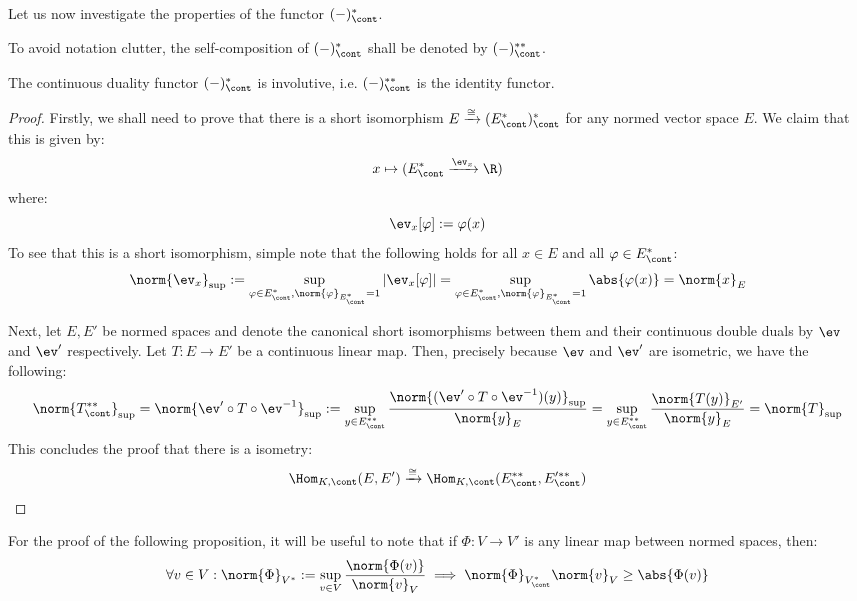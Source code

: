         Let us now investigate the properties of the functor $(-)^*_{\cont}$.
        \begin{convention}
            To avoid notation clutter, the self-composition of $(-)^*_{\cont}$ shall be denoted by $(-)^{**}_{\cont}$.
        \end{convention}
        \begin{lemma} \label{lemma: continuous_duality_involutive}
            The continuous duality functor $(-)^*_{\cont}$ is involutive, i.e. $(-)^{**}_{\cont}$ is the identity functor. 
        \end{lemma}
            \begin{proof}
                Firstly, we shall need to prove that there is a short isomorphism $E \xrightarrow[]{\cong} ( E^*_{\cont} )^*_{\cont}$ for any normed vector space $E$. We claim that this is given by:
                    $$x \mapsto (E^*_{\cont} \xrightarrow[]{\ev_x} \R)$$
                where:
                    $$\ev_x[\varphi] := \varphi(x)$$
                To see that this is a short isomorphism, simple note that the following holds for all $x \in E$ and all $\varphi \in E^*_{\cont}$:
                    $$\norm{\ev_x}_{\sup} := \sup_{\varphi \in E^*_{\cont}, \norm{\varphi}_{E^*_{\cont}} = 1} |\ev_x[\varphi]| = \sup_{\varphi \in E^*_{\cont}, \norm{\varphi}_{E^*_{\cont}} = 1} \abs{\varphi(x)} = \norm{x}_E$$

                Next, let $E, E'$ be normed spaces and denote the canonical short isomorphisms between them and their continuous double duals by $\ev$ and $\ev'$ respectively. Let $T: E \to E'$ be a continuous linear map. Then, precisely because $\ev$ and $\ev'$ are isometric, we have the following:
                    $$\norm{ T^{**}_{\cont} }_{\sup} = \norm{ \ev' \circ T \circ \ev^{-1} }_{\sup} := \sup_{y \in E^{**}_{\cont}} \frac{ \norm{ (\ev' \circ T \circ \ev^{-1})(y) }_{\sup} }{\norm{y}_E} = \sup_{y \in E^{**}_{\cont}} \frac{\norm{T(y)}_{E'}}{\norm{y}_E} = \norm{T}_{\sup}$$
                This concludes the proof that there is a isometry:
                    $$\Hom_{K, \cont}(E, E') \xrightarrow[]{\cong} \Hom_{K, \cont}(E^{**}_{\cont}, E'^{**}_{\cont})$$
            \end{proof}
        For the proof of the following proposition, it will be useful to note that if $\Phi: V \to V'$ is any linear map between normed spaces, then:
            $$\forall v \in V: \norm{\Phi}_{V^*} := \sup_{v \in V} \frac{\norm{\Phi(v)}}{\norm{v}_V} \implies \norm{\Phi}_{V^*_{\cont}} \norm{v}_V \geq \abs{\Phi(v)}$$

